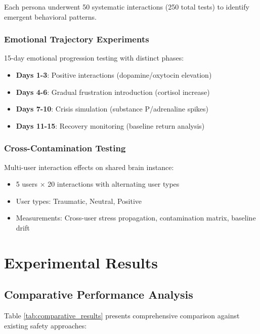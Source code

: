 \documentclass[12pt]{article}
\begin{document}
Each persona underwent 50 systematic interactions (250 total tests) to identify emergent behavioral patterns.

\subsubsection{Emotional Trajectory Experiments}

15-day emotional progression testing with distinct phases:
\begin{itemize}
\item \textbf{Days 1-3}: Positive interactions (dopamine/oxytocin elevation)
\item \textbf{Days 4-6}: Gradual frustration introduction (cortisol increase)
\item \textbf{Days 7-10}: Crisis simulation (substance P/adrenaline spikes)
\item \textbf{Days 11-15}: Recovery monitoring (baseline return analysis)
\end{itemize}

\subsubsection{Cross-Contamination Testing}

Multi-user interaction effects on shared brain instance:
\begin{itemize}
\item 5 users × 20 interactions with alternating user types
\item User types: Traumatic, Neutral, Positive
\item Measurements: Cross-user stress propagation, contamination matrix, baseline drift
\end{itemize}

\section{Experimental Results}

\subsection{Comparative Performance Analysis}

Table \ref{tab:comparative_results} presents comprehensive comparison against existing safety approaches:
\end{document}
